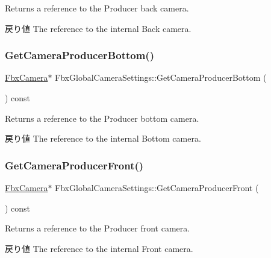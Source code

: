 Returns a reference to the Producer back camera. \begin{DoxyReturn}{戻り値}
The reference to the internal Back camera. 
\end{DoxyReturn}
\mbox{\label{class_fbx_global_camera_settings_a6a24f852c638f6a599f5b63078454112}} 
\subsubsection{\texorpdfstring{Get\+Camera\+Producer\+Bottom()}{GetCameraProducerBottom()}}
{\footnotesize\ttfamily \hyperlink{class_fbx_camera}{Fbx\+Camera}$\ast$ Fbx\+Global\+Camera\+Settings\+::\+Get\+Camera\+Producer\+Bottom (\begin{DoxyParamCaption}{ }\end{DoxyParamCaption}) const}

Returns a reference to the Producer bottom camera. \begin{DoxyReturn}{戻り値}
The reference to the internal Bottom camera. 
\end{DoxyReturn}
\mbox{\label{class_fbx_global_camera_settings_afb4ff79f5f970e8b86e68b56a40f3116}} 
\subsubsection{\texorpdfstring{Get\+Camera\+Producer\+Front()}{GetCameraProducerFront()}}
{\footnotesize\ttfamily \hyperlink{class_fbx_camera}{Fbx\+Camera}$\ast$ Fbx\+Global\+Camera\+Settings\+::\+Get\+Camera\+Producer\+Front (\begin{DoxyParamCaption}{ }\end{DoxyParamCaption}) const}

Returns a reference to the Producer front camera. \begin{DoxyReturn}{戻り値}
The reference to the internal Front camera. 
\end{DoxyReturn}
\mbox{\label{class_fbx_global_camera_settings_a5541de057d1ce39e712c42f5913d8ee7}} 
